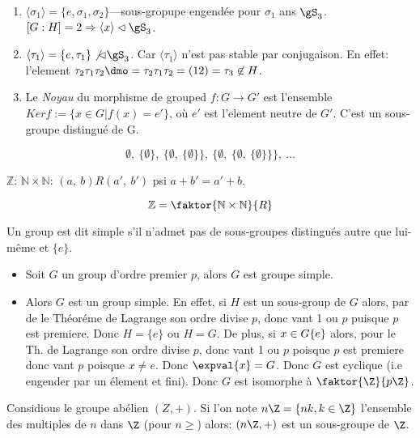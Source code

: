 \begin{examplebox}
	\begin{enumerate}
		\item $\langle \sigma_1 \rangle=\{e,\sigma_1,\sigma_2\}$---sous-gropupe engendée pour $\sigma_1$ ans $\gS_3$. $[G:H]=2\Rightarrow \langle x\rangle\lhd\gS_3$.
		\item $\langle \tau_1\rangle=\{e,\tau_1\}\not\lhd\gS_3$. Car $\langle \tau_1 \rangle$ n'est pas stable par conjugaison. En effet: l'element $\tau_2\tau_1\tau_2\dmo =\tau_2\tau_1\tau_2=(12)=\tau_3\not\in H$.
		\item Le \emph{Noyau} du morphisme de grouped $f:G\rightarrow G'$ est l'ensemble $Ker f:=\{x\in G | f(x)=e'\}$, où $e'$ est l'element neutre de $G'$. C'est un sous-groupe distingué de G.
	\end{enumerate}
\end{examplebox}

$$\emptyset,\ \{\emptyset\},\ \{\emptyset,\ \{\emptyset\}\},\ \{\emptyset,\ \{\emptyset,\ \{\emptyset\}\}\},\ ...$$

$\mathbb{Z}$: $\mathbb{N}\times\mathbb{N}$:
$(a,\ b)R(a',\ b')$ psi $a+b'=a' + b$.

$$\mathbb{Z}=\faktor{\mathbb{N}\times\mathbb{N}}{R}$$

\begin{definition}
	Un group est dit simple s'il n'admet pas de sous-groupes distingués autre que lui-même et $\{e\}$.
\end{definition}

\begin{examplebox}
	\begin{itemize}
		\item Soit $G$ un group d'ordre premier $p$, alors $G$ est groupe simple.
		\item Alors $G$ est un group simple. En effet, si $H$ est un sous-group de $G$ alors, par de le Théoréme de Lagrange son ordre divise $p$, donc vant 1 ou $p$ puisque $p$ est premiere. Donc $H=\{e\}$ ou $H=G$. De plus, si $x\in G\\ \{e\}$ alors, pour le Th. de Lagrange son ordre divise $p$, donc vant 1 ou $p$ poisque $p$ est premiere donc vant $p$ poisque $x\neq e$. Donc $\expval{x}=G$. Donc $G$ est cyclique (i.e engender par un élement et fini). Donc $G$ est isomorphe à $\faktor{\Z}{p\Z}$.
	\end{itemize}
\end{examplebox}

Considious le groupe abélien $(Z, +)$. Si l'on note $n\Z=\{nk, k\in\Z\}$ l'ensemble des multiples de $n$ dans $\Z$ (pour $n\geq$) alors: $(n\Z,+)$ est un sous-groupe de $\Z$.


